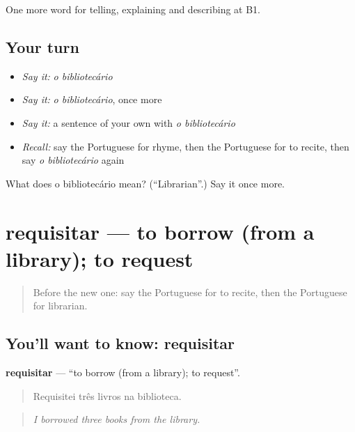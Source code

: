 \begin{grammarlens}[title={What you've built}]
One more word for telling, explaining and describing at B1.
\end{grammarlens}

\subsection*{Your turn}
\begin{itemize}
\raggedright
  \item \emph{Say it:} \emph{o bibliotecário}
  \item \emph{Say it:} \emph{o bibliotecário}, once more
  \item \emph{Say it:} a sentence of your own with \emph{o bibliotecário}
  \item \emph{Recall:} say the Portuguese for rhyme, then the Portuguese for to recite, then say \emph{o bibliotecário} again
\end{itemize}

\begin{tcolorbox}[breakable,colback=teal!4,colframe=teal!35!black,title={Before you move on}]
What does o bibliotecário mean? (\textquotedblleft{}Librarian\textquotedblright{}.) Say it once more.
\end{tcolorbox}
\section[requisitar]{requisitar — to borrow (from a library); to request}

\label{lesson:PT-C525-requisitar}



\begin{quote}
Before the new one: say the Portuguese for to recite, then the Portuguese for librarian.
\end{quote}

\subsection*{You'll want to know: requisitar}
\textbf{requisitar} — \textquotedblleft{}to borrow (from a library); to request\textquotedblright{}.

\begin{quote}
Requisitei três livros na biblioteca.
\end{quote}

\begin{quote}
\emph{I borrowed three books from the library.}
\end{quote}

